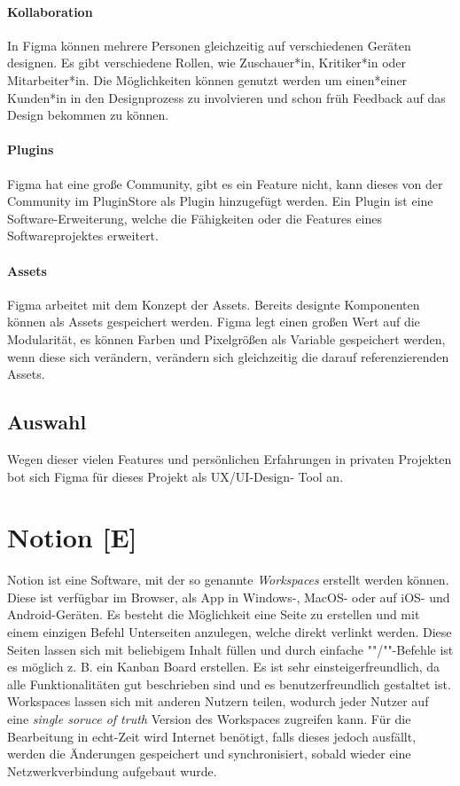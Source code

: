 \paragraph{Kollaboration}
In Figma können mehrere Personen gleichzeitig auf verschiedenen Geräten designen. Es gibt verschiedene Rollen, wie Zuschauer*in, Kritiker*in oder Mitarbeiter*in. Die Möglichkeiten können genutzt werden um einen*einer Kunden*in in den Designprozess zu involvieren und schon früh Feedback auf das Design bekommen zu können.
\paragraph{Plugins}
Figma hat eine große Community, gibt es ein Feature nicht, kann dieses von der Community im PluginStore als Plugin hinzugefügt werden. Ein Plugin ist eine Software-Erweiterung, welche die Fähigkeiten oder die Features eines Softwareprojektes erweitert.

\paragraph{Assets}
Figma arbeitet mit dem Konzept der Assets. Bereits designte Komponenten können als Assets gespeichert werden. Figma legt einen großen Wert auf die Modularität, es können Farben und Pixelgrößen als Variable gespeichert werden, wenn diese sich verändern, verändern sich gleichzeitig die darauf referenzierenden Assets.

\subsection{Auswahl}
Wegen dieser vielen Features und persönlichen Erfahrungen in privaten Projekten bot sich Figma für dieses Projekt als UX/UI-Design- Tool an.

\section{Notion [E]}
Notion ist eine Software, mit der so genannte \emph{Workspaces} erstellt werden können. 
Diese ist verfügbar im Browser, als App in Windows-, MacOS- oder auf iOS- und Android-Geräten. 
Es besteht die Möglichkeit eine Seite zu erstellen und mit einem einzigen Befehl Unterseiten anzulegen, welche direkt verlinkt werden.
Diese Seiten lassen sich mit beliebigem Inhalt füllen und durch einfache ""/""-Befehle ist es möglich z. B. ein Kanban Board erstellen. 
Es ist sehr einsteigerfreundlich, da alle Funktionalitäten gut beschrieben sind und es benutzerfreundlich gestaltet ist.
Workspaces lassen sich mit anderen Nutzern teilen, wodurch jeder Nutzer auf eine \emph{single soruce of truth} Version des Workspaces zugreifen kann.
Für die Bearbeitung in echt-Zeit wird Internet benötigt, falls dieses jedoch ausfällt, werden die Änderungen gespeichert und synchronisiert, sobald wieder eine Netzwerkverbindung aufgebaut wurde.
\cite{NotionAbout}

